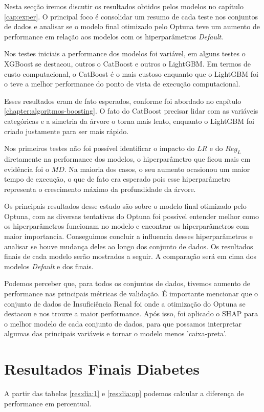 Nesta secção iremos discutir os resultados obtidos pelos modelos no capítulo \ref{cap:exper}. O principal foco é consolidar um resumo de cada teste nos conjuntos de dados e analisar se o modelo final otimizado pelo Optuna teve um aumento de performance em relação aos modelos com os hiperparâmetros \textit{Default}.

Nos testes iniciais a performance dos modelos foi variável, em alguns testes o XGBoost se destacou, outros o CatBoost e outros o LightGBM. Em termos de custo computacional, o CatBoost é o mais custoso enquanto que o LightGBM foi o teve a melhor performance do ponto de vista de execução computacional.

Esses resultados eram de fato esperados, conforme foi abordado no capítulo \ref{chapter:algoritmos-boosting}. O fato do CatBoost precisar lidar com as variáveis categóricas e a simetria da árvore o torna mais lento, enquanto o LightGBM foi criado justamente para ser mais rápido.

Nos primeiros testes não foi possível identificar o impacto do $LR$ e do $Reg_L$ diretamente na performance dos modelos, o hiperparâmetro que ficou mais em evidência foi o $MD$. Na maioria dos casos, o seu aumento ocasionou um maior tempo de execução, o que de fato era esperado pois esse hiperparâmetro representa o crescimento máximo da profundidade da árvore.

Os principais resultados desse estudo são sobre o modelo final otimizado pelo Optuna, com as diversas tentativas do Optuna foi possível entender melhor como os hiperparâmetros funcionam no modelo e encontrar os hiperparâmetros com  maior importancia. Conseguimos concluir a influencia desses hiperparâmetros e analisar se houve mudança deles ao longo dos conjunto de dados. Os resultados finais de cada modelo serão mostrados a seguir. A comparação será em cima dos modelos \textit{Default} e dos finais.

Podemos perceber que, para todos os conjuntos de dados, tivemos aumento de performance nas principais métricas de validação. É importante mencionar que o conjunto de dados de Insuficiência Renal foi onde a otimização do Optuna se destacou e nos trouxe a maior performance. Após isso, foi aplicado o SHAP para o melhor modelo de cada conjunto de dados, para que possamos interpretar algumas das principais variáveis e tornar o modelo menos 'caixa-preta'.

\section{Resultados Finais Diabetes} 
A partir das tabelas \ref{res:dia:1} e \ref{res:dia:op} podemos calcular a diferença de performance em percentual.

